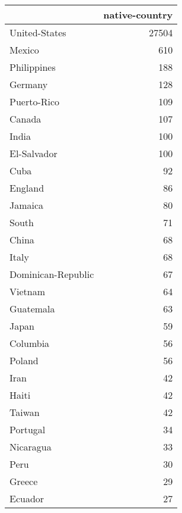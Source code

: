 \begin{tabular}{lr}
\toprule
{} &  native-country \\
\midrule
 United-States              &           27504 \\
 Mexico                     &             610 \\
 Philippines                &             188 \\
 Germany                    &             128 \\
 Puerto-Rico                &             109 \\
 Canada                     &             107 \\
 India                      &             100 \\
 El-Salvador                &             100 \\
 Cuba                       &              92 \\
 England                    &              86 \\
 Jamaica                    &              80 \\
 South                      &              71 \\
 China                      &              68 \\
 Italy                      &              68 \\
 Dominican-Republic         &              67 \\
 Vietnam                    &              64 \\
 Guatemala                  &              63 \\
 Japan                      &              59 \\
 Columbia                   &              56 \\
 Poland                     &              56 \\
 Iran                       &              42 \\
 Haiti                      &              42 \\
 Taiwan                     &              42 \\
 Portugal                   &              34 \\
 Nicaragua                  &              33 \\
 Peru                       &              30 \\
 Greece                     &              29 \\
 Ecuador                    &              27 \\

\end{tabular}
